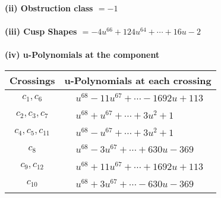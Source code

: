\documentclass[1p]{elsarticle_modified}
\theoremstyle{definition}
\begin{document}
\flushleft \textbf{(ii) Obstruction class $= -1$}\\~\\
\flushleft \textbf{(iii) Cusp Shapes $= -4 u^{66}+124 u^{64}+\cdots+16 u-2$}\\~\\
\newpage\renewcommand{\arraystretch}{1}
\flushleft \textbf{(iv) u-Polynomials at the component}\newline \\
\begin{tabular}{m{50pt}|m{274pt}}
Crossings & \hspace{64pt}u-Polynomials at each crossing \\
\hline $$\begin{aligned}c_{1},c_{6}\end{aligned}$$&$\begin{aligned}
&u^{68}-11 u^{67}+\cdots-1692 u+113
\end{aligned}$\\
\hline $$\begin{aligned}c_{2},c_{3},c_{7}\end{aligned}$$&$\begin{aligned}
&u^{68}+u^{67}+\cdots+3 u^2+1
\end{aligned}$\\
\hline $$\begin{aligned}c_{4},c_{5},c_{11}\end{aligned}$$&$\begin{aligned}
&u^{68}- u^{67}+\cdots+3 u^2+1
\end{aligned}$\\
\hline $$\begin{aligned}c_{8}\end{aligned}$$&$\begin{aligned}
&u^{68}-3 u^{67}+\cdots+630 u-369
\end{aligned}$\\
\hline $$\begin{aligned}c_{9},c_{12}\end{aligned}$$&$\begin{aligned}
&u^{68}+11 u^{67}+\cdots+1692 u+113
\end{aligned}$\\
\hline $$\begin{aligned}c_{10}\end{aligned}$$&$\begin{aligned}
&u^{68}+3 u^{67}+\cdots-630 u-369
\end{aligned}$\\
\hline
\end{tabular}\\~\\
\end{document}

